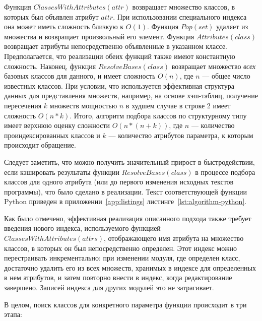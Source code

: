 Функция $ClassesWithAttributes(attr)$ возвращает множество классов, в
которых был объявлен атрибут $attr$. При использовании специального индекса она
может иметь сложность близкую к $O(1)$. Функция $Pop(set)$ удаляет из множества
и возвращает произвольный его элемент. Функция $Attributes(class)$ возвращает
атрибуты непосредственно объявленные в указанном классе. Предполагается, что
реализации обеих функций также имеют константную сложность. Наконец, функция
$ResolveBases(class)$ возвращает множество \emph{всех} базовых классов для
данного, и имеет сложность $O(n)$, где $n$ --- общее число известных классов.
При условии, что используется эффективная структура данных для представления
множеств, например, на основе хэш-таблиц, получение пересечения $k$ множеств
мощностью $n$ в худшем случае в строке 2 имеет сложность $O(n*k)$.  Итого,
алгоритм подбора классов по структурному типу имеет верхнюю оценку сложности
$O(n* (n + k))$, где $n$ --- количество проиндексированных классов и $k$ ---
количество атрибутов параметра, к которым происходит обращение.

Следует заметить, что можно получить значительный прирост в быстродействии, если
кэшировать результаты функции $ResolveBases(class)$ в процессе подбора классов
для одного атрибута (или до первого изменения исходных текстов программы), что
было сделано в реализации. Текст соответствующей функции Python приведен в
приложении~\ref{app:listings} листинге~\ref{lst:algorithm-python}.

Как было отмечено, эффективная реализация описанного подхода также требует
введения нового индекса, используемого функцией $ClassesWithAttributes(attrs)$,
отображающего имя атрибута на множество классов, в которых он был
непосредственно определен.  Этот индекс можно перестраивать инкрементально: при
изменении модуля, где определен класс, достаточно удалить его из всех множеств,
хранимых в индексе для определенных в нем атрибутов, и затем повторно внести в
индекс, когда редактирование завершено. Записей индекса для других модулей это
не затрагивает.

В целом, поиск классов для конкретного параметра функции происходит в три этапа:

